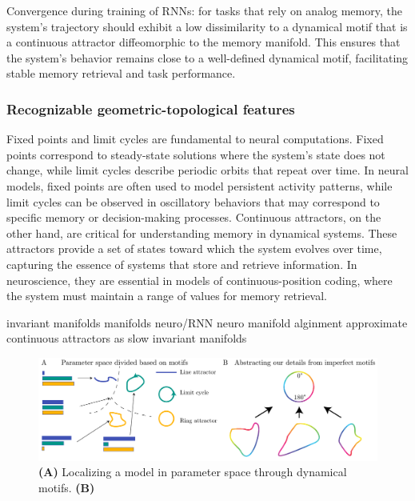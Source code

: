 \documentclass{article}
\theoremstyle{definition} \newtheorem{definition}{Definition}  \newtheorem{example}{Example}
\theoremstyle{remark} \newtheorem{remark}{Remark}
\newcounter{ct}
\begin{document}
Convergence during training of RNNs: for tasks that rely on analog memory, the system's trajectory should exhibit a low dissimilarity to a dynamical motif that is a continuous attractor diffeomorphic to the memory manifold.
 This ensures that the system's behavior remains close to a well-defined dynamical motif, facilitating stable memory retrieval and task performance.


\subsubsection{Recognizable geometric-topological features}
 Fixed points and limit cycles are fundamental to neural computations.
Fixed points correspond to steady-state solutions where the system’s state does not change, while limit cycles describe periodic orbits that repeat over time.
 In neural models, fixed points are often used to model persistent activity patterns, while limit cycles can be observed in oscillatory behaviors that may correspond to specific memory or decision-making processes.
  Continuous attractors, on the other hand, are critical for understanding memory in dynamical systems.
These attractors provide a set of states toward which the system evolves over time, capturing the essence of systems that store and retrieve information.
 In neuroscience, they are essential in models of continuous-position coding, where the system must maintain a range of values for memory retrieval.

invariant manifolds
manifolds neuro/RNN\citep{langdon2023unifying, can2021emergence,cueva2021continuous,gort2024emergence,mishra2021continual,chaudhuri2019attractor, ghazizadeh2021slowmanifold, duncker2021dynamics, pezon2024linking}
neuro \citep{fortunato2024nonlinear}
manifold alginment \citep{kuoch2024probing}
approximate continuous attractors as slow invariant manifolds\citep{Sagodi2024a}

\begin{figure}[htbp]
    \centering
    \includegraphics[width=\linewidth]{motifpspace_dssimilarity}
    \caption{
    \textbf{(A)} Localizing a model in parameter space through dynamical motifs.
     \textbf{(B)} }
    \label{fig:motifpspace_dssimilarity}
\end{figure}
\end{document}
